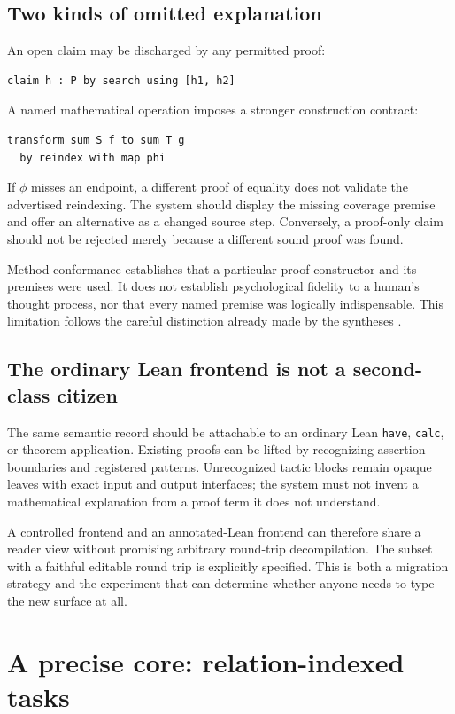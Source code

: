 \documentclass[11pt,letterpaper]{article}
\newcommand{\code}[1]{\nolinkurl{#1}}
\theoremstyle{definition}
\begin{document}
\subsection{Two kinds of omitted explanation}
An open claim may be discharged by any permitted proof:
\begin{lstlisting}
claim h : P by search using [h1, h2]
\end{lstlisting}
A named mathematical operation imposes a stronger construction contract:
\begin{lstlisting}
transform sum S f to sum T g
  by reindex with map phi
\end{lstlisting}
If \(\phi\) misses an endpoint, a different proof of equality does not validate the
advertised reindexing. The system should display the missing coverage premise and
offer an alternative as a changed source step. Conversely, a proof-only claim
should not be rejected merely because a different sound proof was found.

Method conformance establishes that a particular proof constructor and its
premises were used. It does not establish psychological fidelity to a human's
thought process, nor that every named premise was logically indispensable.
This limitation follows the careful distinction already made by the syntheses
\cite{synthesis,review}.

\subsection{The ordinary Lean frontend is not a second-class citizen}
The same semantic record should be attachable to an ordinary Lean \code{have},
\code{calc}, or theorem application. Existing proofs can be lifted by recognizing
assertion boundaries and registered patterns. Unrecognized tactic blocks remain
opaque leaves with exact input and output interfaces; the system must not invent
a mathematical explanation from a proof term it does not understand.

A controlled frontend and an annotated-Lean frontend can therefore share a reader
view without promising arbitrary round-trip decompilation. The subset with a
faithful editable round trip is explicitly specified. This is both a migration
strategy and the experiment that can determine whether anyone needs to type the
new surface at all.

\section{A precise core: relation-indexed tasks}\label{sec:core}
\end{document}
